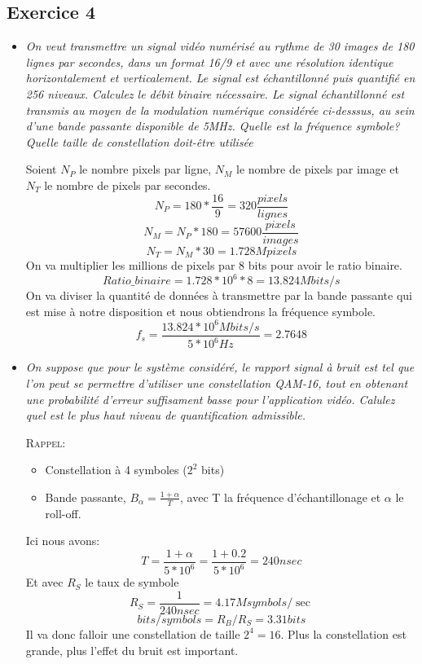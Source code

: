 \subsection{Exercice 4}
\begin{itemize}
	\item \textit{On veut transmettre un signal vidéo numérisé au rythme de 30 images de 180 lignes par secondes, dans un format 16/9 et avec une résolution identique horizontalement et verticalement. Le signal est échantillonné puis quantifié en 256 niveaux. Calculez le débit binaire nécessaire. Le signal échantillonné est transmis au moyen de la modulation numérique considérée ci-desssus, au sein d'une bande passante disponible de 5MHz. Quelle est la fréquence symbole? Quelle taille  de constellation doit-être utilisée}

	\begin{framed}
	Soient $N_P$ le nombre pixels par ligne, $N_M $ le nombre de pixels par image et $N_T$ le nombre de pixels par secondes.
		\[ N_P = 180 *\frac{16}{9} = 320 \frac{pixels}{lignes} \]
		\[ N_M = N_P*180 = 57600 \frac{pixels}{images} \]
		\[ N_T = N_M * 30 = 1.728 Mpixels \]
	On va multiplier les millions de pixels par 8 bits pour avoir le ratio binaire.
		\[ Ratio\_binaire = 1.728 * 10^6 * 8 = 13.824 Mbits/s \]
	On va diviser la quantité de données à transmettre par la bande passante qui est mise à notre disposition et nous obtiendrons la fréquence symbole.
		\[ f_s = \frac{13.824 * 10^6 Mbits/s}{5 * 10^6 Hz} = 2.7648 \]
	\end{framed}
	\item \textit{On suppose que pour le système considéré, le rapport signal à bruit est tel que l'on peut se permettre d'utiliser une constellation QAM-16, tout en obtenant une probabilité d'erreur suffisament basse pour l'application vidéo. Calulez quel est le plus haut niveau de quantification admissible.}
	\begin{framed}
		\textsc{Rappel:}
		\begin{itemize}
			\item Constellation à 4 symboles ($2^2$ bits)
			\item Bande passante, $B_\alpha = \frac{1+\alpha}{T}$, avec T la fréquence d'échantillonage et $\alpha$ le roll-off.
		\end{itemize}
		Ici nous avons:
		\[ T = \frac{1+\alpha}{5*10^6} = \frac{1+0.2}{5*10^6} = 240nsec \]
		Et avec $R_S$ le taux de symbole
		\[ R_S = \frac{1}{240nsec} = 4.17Msymbols/\sec \]
		\[ bits/symbols=R_B/R_S=3.31bits \]
		Il va donc falloir une constellation de taille $2^4=16$. Plus la constellation est grande, plus l'effet du bruit est important.

	\end{framed}

\end{itemize}
